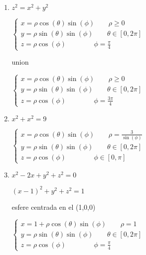 \documentclass[../practica_09.tex]{subfiles}
\begin{document}
    \begin{enumerate}
        \item $ z^2 = x^2 + y^2$

            $\left \{\begin{array}{ll}
                x = \rho\cos(\theta)\sin(\phi) \qquad \rho \geq 0\\
                y = \rho\sin(\theta)\sin(\phi) \qquad \theta \in [0, 2\pi]\\
                z = \rho\cos(\phi) \qquad\qquad \phi = \frac{\pi}{4}
            \end{array} \right.$

            union

            $\left \{\begin{array}{ll}
                x = \rho\cos(\theta)\sin(\phi) \qquad \rho \geq 0\\
                y = \rho\sin(\theta)\sin(\phi) \qquad \theta \in [0, 2\pi]\\
                z = \rho\cos(\phi) \qquad\qquad \phi = \frac{3\pi}{4}
            \end{array} \right.$

        \item $ x^2 + x^2 = 9$
        
            $\left \{\begin{array}{ll}
                x = \rho\cos(\theta)\sin(\phi) \qquad \rho = \frac{3}{\sin(\phi)} \\
                y = \rho\sin(\theta)\sin(\phi) \qquad \theta \in [0, 2\pi]\\
                z = \rho\cos(\phi) \qquad\qquad \phi \in [0, \pi]
            \end{array} \right.$

        \item $ x^2 - 2x + y^2 + z^2 = 0$
        
            $ (x-1)^2 + y^2 + z^2 = 1 $

            esfere centrada en el (1,0,0)

            $\left \{\begin{array}{ll}
                x = 1 + \rho\cos(\theta)\sin(\phi) \qquad \rho = 1\\
                y = \rho\sin(\theta)\sin(\phi) \qquad \theta \in [0, 2\pi]\\
                z = \rho\cos(\phi) \qquad\qquad \phi = \frac{\pi}{4}
            \end{array} \right.$

    \end{enumerate}
\end{document}
